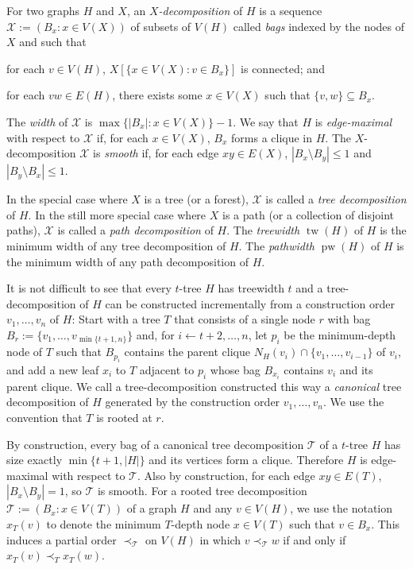 \documentclass[kpfonts]{patmorin}
\DeclareMathOperator{\tw}{tw}
\DeclareMathOperator{\pw}{pw}
\theoremstyle{named}
\begin{document}
For two graphs $H$ and $X$, an \emph{$X$-decomposition} of $H$ is a sequence $\mathcal{X}:=(B_x:x\in V(X))$ of subsets of $V(H)$ called \emph{bags} indexed by the nodes of $X$ and such that
 \begin{inparaenum}[(i)]
     \item for each $v\in V(H)$, $X[\{x\in V(X):v\in B_x\}]$ is connected; and
     \item for each $vw\in E(H)$, there exists some $x\in V(X)$ such that $\{v,w\}\subseteq B_x$.
\end{inparaenum}
The \emph{width} of $\mathcal{X}$ is $\max\{|B_x|:x\in V(X)\}-1$. We say that $H$ is \emph{edge-maximal} with respect to $\mathcal{X}$ if, for each $x\in V(X)$, $B_x$ forms a clique in $H$. The $X$-decomposition $\mathcal{X}$ is \emph{smooth} if, for each edge $xy\in E(X)$, $|B_x\setminus B_y|\le 1$ and $|B_y\setminus B_x|\le 1$.

In the special case where $X$ is a tree (or a forest), $\mathcal{X}$ is called a \emph{tree decomposition} of $H$.  In the still more special case where $X$ is a path (or a collection of disjoint paths), $\mathcal{X}$ is called a \emph{path decomposition} of $H$. The \emph{treewidth} $\tw(H)$ of $H$ is the minimum width of any tree decomposition of $H$. The \emph{pathwidth} $\pw(H)$ of $H$ is the minimum width of any path decomposition of $H$.

It is not difficult to see that every $t$-tree $H$ has treewidth $t$ and a tree-decomposition of $H$ can be constructed incrementally from a construction order $v_1,\ldots,v_n$ of $H$: Start with a tree $T$ that consists of a single node $r$ with bag $B_r:=\{v_1,\ldots,v_{\min\{t+1,n\}}\}$ and, for $i\gets t+2,\ldots,n$, let $p_i$ be the minimum-depth node of $T$ such that $B_{p_i}$ contains the parent clique $N_H(v_i)\cap\{v_1,\ldots,v_{i-1}\}$ of $v_i$, and add a new leaf $x_i$ to $T$ adjacent to $p_i$ whose bag $B_{x_i}$ contains $v_i$ and its parent clique.  We call a tree-decomposition constructed this way a \emph{canonical} tree decomposition of $H$ generated by the construction order $v_1,\ldots,v_n$.  We use the convention that $T$ is rooted at $r$.

By construction, every bag of a canonical tree decomposition $\mathcal{T}$ of a $t$-tree $H$ has size exactly $\min\{t+1,|H|\}$ and its vertices form a clique.  Therefore $H$ is edge-maximal with respect to $\mathcal{T}$.  Also by construction, for each edge $xy\in E(T)$, $|B_x\setminus B_y|=1$, so $\mathcal{T}$ is smooth.
For a rooted tree decomposition $\mathcal{T}:=(B_x:x\in V(T))$ of a graph $H$ and any $v\in V(H)$, we use the notation $x_T(v)$ to denote the minimum $T$-depth node $x\in V(T)$ such that $v\in B_x$.  This induces a partial order $\prec_{\mathcal{T}}$ on $V(H)$ in which $v\prec_{\mathcal{T}} w$ if and only if $x_T(v)\prec_T x_T(w)$.
\end{document}
